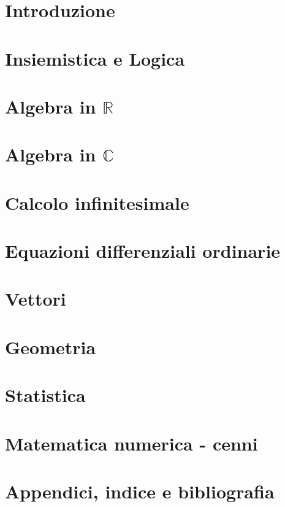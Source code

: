 
\part{Introduzione}


\part{Insiemistica e Logica}


\part{Algebra in $\mathbb{R}$}


\part{Algebra in $\mathbb{C}$}\label{book:complex_algebra}


\part{Calcolo infinitesimale}


\part{Equazioni differenziali ordinarie}


\part{Vettori}


\part{Geometria}


\part{Statistica}

\part{Matematica numerica - cenni}


\part{Appendici, indice e bibliografia}
